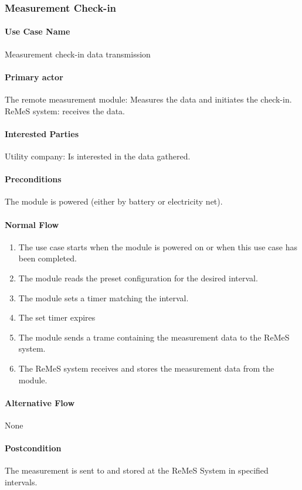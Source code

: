 \subsubsection{Measurement Check-in}

\paragraph{Use Case Name}
Measurement check-in data transmission
\paragraph{Primary actor}
The remote measurement module: Measures the data and initiates the check-in.\\
ReMeS system: receives the data.
\paragraph{Interested Parties}
Utility company: Is interested in the data gathered.
\paragraph{Preconditions}
The module is powered (either by battery or electricity net).
\paragraph{Normal Flow}
\begin{enumerate}
	\item The use case starts when the module is powered on or when this use case has been completed.
	\item The module reads the preset configuration for the desired interval.
	\item The module sets a timer matching the interval.
	\item The set timer expires 
	\item The module sends a trame containing the measurement data to the ReMeS system.
	\item The ReMeS system receives and stores the measurement data from the module.
\end{enumerate}

\paragraph{Alternative Flow}
None
\paragraph{Postcondition}
The measurement is sent to and stored at the ReMeS System in specified intervals.
